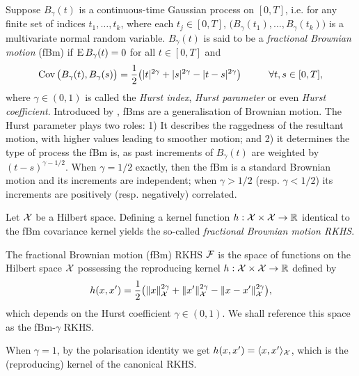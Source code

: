 Suppose $B_\gamma(t)$ is a continuous-time Gaussian process on $[0,T]$, i.e. for any finite set of indices $t_1,\dots,t_k$, where each $t_j \in [0,T]$, $\big(B_\gamma(t_1),\dots,B_\gamma(t_k)\big)$ is a multivariate normal random variable.
$B_\gamma(t)$ is said to be a \emph{fractional Brownian motion} (fBm) if $\operatorname{E} B_\gamma(t) = 0$ for all $t \in [0,T]$ and 
\[
  \operatorname{Cov}\big(B_\gamma(t),B_\gamma(s) \big) = \frac{1}{2}\big( |t|^{2\gamma} + |s|^{2\gamma} - |t-s|^{2\gamma} \big) \hspace{1cm} \forall t,s \in [0,T],
\]
where $\gamma \in (0,1)$ is called the \emph{Hurst index}, \emph{Hurst parameter} or even \emph{Hurst coefficient}.
Introduced by \citet{mandelbrot1968fractional}, fBms are a generalisation of Brownian motion.
The Hurst parameter plays two roles: 1) It describes the raggedness of the resultant motion, with higher values leading to smoother motion; and 2) it determines the type of process the fBm is, as past increments of $B_\gamma(t)$ are weighted by $(t-s)^{\gamma-1/2}$.
When $\gamma=1/2$ exactly, then the fBm is a standard Brownian motion and its increments are independent; when $\gamma > 1/2$ (resp. $\gamma < 1/2$) its increments are positively (resp. negatively) correlated.


Let ${\mathcal X}$ be a Hilbert space. 
Defining a kernel function $h:{\mathcal X}\times{\mathcal X}\to\mathbb{R}$ identical to the fBm covariance kernel yields the so-called \emph{fractional Brownian motion RKHS}.

\begin{definition}\label{def:fbmrkhs}
  The fractional Brownian motion (fBm) RKHS ${\mathcal F}$ is the space of functions on the Hilbert space ${\mathcal X}$ possessing the reproducing kernel $h:{\mathcal X}\times{\mathcal X}\to\mathbb{R}$ defined by
  \[
    h(x,x') = \frac{1}{2}\big( \lVert x\rVert_{\mathcal X}^{2\gamma} + \lVert x'\rVert_{\mathcal X}^{2\gamma} - \lVert x-x'\rVert_{\mathcal X}^{2\gamma} \big),
  \]
  which depends on the Hurst coefficient $\gamma \in (0,1)$.
  We shall reference this space as the fBm-$\gamma$ RKHS.
\end{definition}

\begin{remark}
  When $\gamma=1$, by the polarisation identity we get $h(x,x') = \langle x,x'\rangle_{\mathcal X}$, which is the (reproducing) kernel of the canonical RKHS.
\end{remark}

